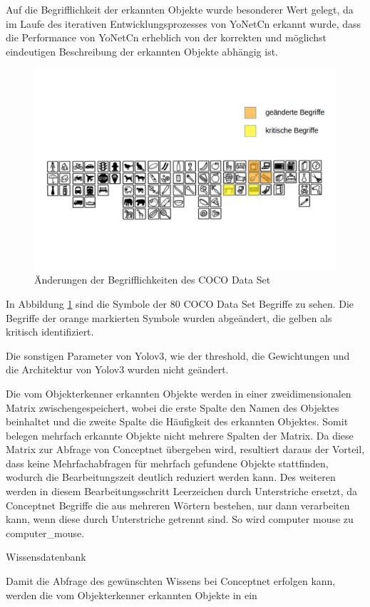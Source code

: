 Auf die Begrifflichkeit der erkannten Objekte wurde besonderer Wert gelegt, da im Laufe des iterativen Entwicklungsprozesses von YoNetCn erkannt wurde, dass die Performance von YoNetCn erheblich von der korrekten und möglichst eindeutigen Beschreibung der erkannten Objekte abhängig ist. 



\begin{figure}[h]
	
	\begin{center}
		
		\includegraphics[width=16cm]{images/COCO_Names.png}
		
		\caption{Änderungen der Begrifflichkeiten des COCO Data Set}
		
		\label{COCO_Names}
		
	\end{center}
	
	
\end{figure}

In Abbildung \ref{COCO_Names} sind die Symbole der 80 COCO Data Set Begriffe zu sehen. Die Begriffe der orange markierten Symbole wurden abgeändert, die gelben als kritisch identifiziert.


Die sonstigen Parameter von Yolov3, wie der threshold, die Gewichtungen und die Architektur von Yolov3 wurden nicht geändert. 

Die vom Objekterkenner erkannten Objekte werden in einer zweidimensionalen Matrix zwischengespeichert, wobei die erste Spalte den Namen des Objektes beinhaltet und die zweite Spalte die Häufigkeit des erkannten Objektes. Somit belegen mehrfach erkannte Objekte nicht mehrere Spalten der Matrix. Da diese Matrix zur Abfrage von Conceptnet übergeben wird, resultiert daraus der Vorteil, dass keine Mehrfachabfragen für mehrfach gefundene Objekte stattfinden, wodurch die Bearbeitungszeit deutlich reduziert werden kann. Des weiteren werden in diesem Bearbeitungsschritt Leerzeichen durch Unterstriche ersetzt, da Conceptnet Begriffe die aus mehreren Wörtern bestehen, nur dann verarbeiten kann, wenn diese durch Unterstriche getrennt sind. So wird computer mouse zu computer\_mouse. 


 
 
Wissensdatenbank

Damit die Abfrage des gewünschten Wissens bei Conceptnet erfolgen kann, werden die vom Objekterkenner erkannten Objekte in ein 






